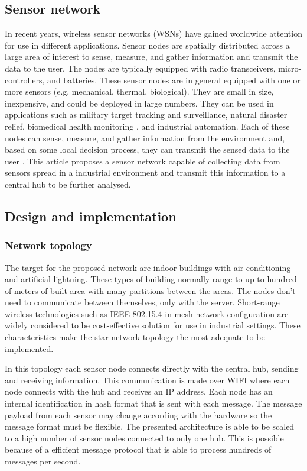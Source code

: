\documentclass[conference]{IEEEtran}
\begin{document}
\subsection{Sensor network}
In recent years, wireless sensor networks (WSNs) have gained worldwide attention for use in different applications. Sensor nodes are spatially distributed across a large area of interest to sense, measure, and gather information and transmit the data to the user. The nodes are typically equipped with radio transceivers, micro-controllers, and batteries.  These sensor nodes are in general equipped with one or more sensors (e.g. mechanical, thermal, biological)\cite{Ribeiro2010}. They are small in size, inexpensive, and could be deployed in large numbers. They can be used in applications such as military target tracking and surveillance, natural disaster relief, biomedical health monitoring , and industrial automation.\cite{Cheffena2012}
Each of these nodes can sense, measure, and gather information from the environment and, based on some local decision process, they can transmit the sensed data to the user \cite{Ribeiro2010}.
This article proposes a sensor network capable of collecting data from sensors spread in a industrial environment and transmit this information to a central hub to be further analysed.
\subsection{Design and implementation}

\subsubsection{Network topology}
The target for the proposed network are indoor buildings with air conditioning and artificial lightning.
These types of building normally range to up to hundred of meters of built area with many partitions between the areas.
The nodes don’t need to communicate between themselves, only with the server.
Short-range wireless technologies such as IEEE 802.15.4 in mesh network configuration are widely considered to be cost-effective solution for use in industrial settings\cite{Cheffena2012}.
These characteristics make the star network topology the most adequate to be implemented.

In this topology each sensor node connects directly with the central hub, sending and receiving information.
This communication is made over WIFI where each node connects with the hub and receives an IP address.
Each node has an internal identification in hash format that is sent with each message.
The message payload from each sensor may change according with the hardware so the message format must be flexible.
The presented architecture is able to be scaled to a high number of sensor nodes connected to only one hub. This is possible because of a efficient message protocol that is able to process hundreds of messages per second\cite{Scalagent2015}.
\end{document}
